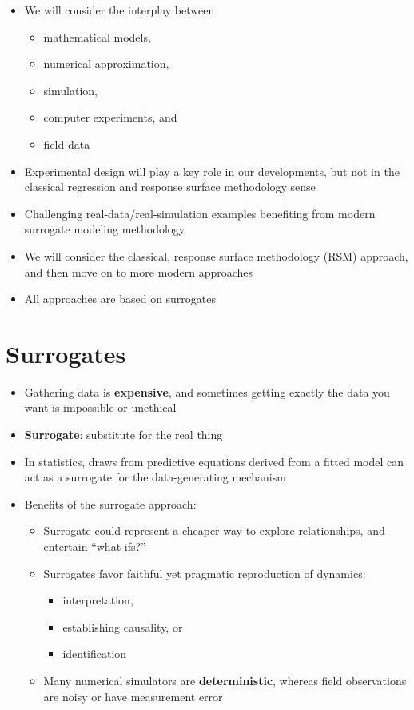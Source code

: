 \documentclass[
  letterpaper,
  DIV=11,
  numbers=noendperiod]{scrreprt}
\providecommand{\tightlist}{%
  \setlength{\itemsep}{0pt}\setlength{\parskip}{0pt}}\usepackage{longtable,booktabs,array}
\begin{document}
\begin{itemize}
\tightlist
\item
  We will consider the interplay between

  \begin{itemize}
  \tightlist
  \item
    mathematical models,
  \item
    numerical approximation,
  \item
    simulation,
  \item
    computer experiments, and
  \item
    field data
  \end{itemize}
\item
  Experimental design will play a key role in our developments, but not
  in the classical regression and response surface methodology sense
\item
  Challenging real-data/real-simulation examples benefiting from modern
  surrogate modeling methodology
\item
  We will consider the classical, response surface methodology (RSM)
  approach, and then move on to more modern approaches
\item
  All approaches are based on surrogates
\end{itemize}

\hypertarget{surrogates}{%
\section{Surrogates}\label{surrogates}}

\begin{itemize}
\tightlist
\item
  Gathering data is \textbf{expensive}, and sometimes getting exactly
  the data you want is impossible or unethical
\item
  \textbf{Surrogate}: substitute for the real thing
\item
  In statistics, draws from predictive equations derived from a fitted
  model can act as a surrogate for the data-generating mechanism
\item
  Benefits of the surrogate approach:

  \begin{itemize}
  \tightlist
  \item
    Surrogate could represent a cheaper way to explore relationships,
    and entertain ``what ifs?''
  \item
    Surrogates favor faithful yet pragmatic reproduction of dynamics:

    \begin{itemize}
    \tightlist
    \item
      interpretation,
    \item
      establishing causality, or
    \item
      identification
    \end{itemize}
  \item
    Many numerical simulators are \textbf{deterministic}, whereas field
    observations are noisy or have measurement error
  \end{itemize}
\end{itemize}
\end{document}
